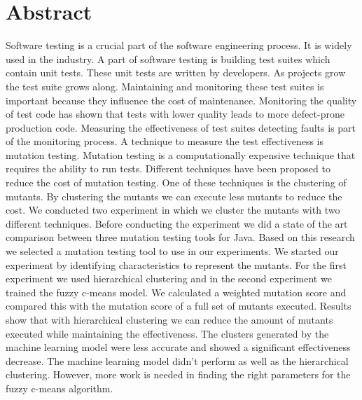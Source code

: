 \documentclass[../main]{subfiles}
\begin{document}
\chapter*{Abstract}
Software testing is a crucial part of the software engineering process. 
It is widely used in the industry.
A part of software testing is building test suites which contain unit tests.
These unit tests are written by developers. 
As projects grow the test suite grows along.
Maintaining and monitoring these test suites is important because they influence the cost of maintenance.
Monitoring the quality of test code has shown that tests with lower quality leads to more defect-prone production code.
Measuring the effectiveness of test suites detecting faults is part of the monitoring process.
A technique to measure the test effectiveness is mutation testing.
Mutation testing is a computationally expensive technique that requires the ability to run tests.
Different techniques have been proposed to reduce the cost of mutation testing.
One of these techniques is the clustering of mutants.
By clustering the mutants we can execute less mutants to reduce the cost.
We conducted two experiment in which we cluster the mutants with two different techniques.
Before conducting the experiment we did a state of the art comparison between three mutation testing tools for Java.
Based on this research we selected a mutation testing tool to use in our experiments.
\newline
We started our experiment by identifying characteristics to represent the mutants.
For the first experiment we used hierarchical clustering and in the second experiment we trained the fuzzy c-means model.
We calculated a weighted mutation score and compared this with the mutation score of a full set of mutants executed.
Results show that with hierarchical clustering we can reduce the amount of mutants executed while maintaining the effectiveness.
The clusters generated by the machine learning model were less accurate and showed a significant effectiveness decrease.
The machine learning model didn't perform as well as the hierarchical clustering.
However, more work is needed in finding the right parameters for the fuzzy c-means algorithm. 
\end{document}
